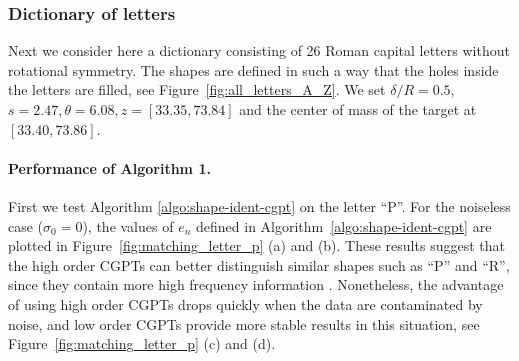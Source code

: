 \subsubsection{Dictionary of letters}
Next we consider here a dictionary consisting of 26 Roman capital
letters without rotational symmetry. The shapes are defined in
such a way that the holes inside the letters are filled, see
Figure~\ref{fig:all_letters_A_Z}. We set $\delta/R=0.5$, $s= 2.47,
\theta = 6.08, z= [33.35, 73.84]$ and the center of mass of the
target at $[33.40, 73.86]$.

\paragraph{Performance of Algorithm 1.}

First we test Algorithm \ref{algo:shape-ident-cgpt} on the letter
``P''. For the noiseless case ($\sigma_0=0$), the values of $e_n$
defined in Algorithm~\ref{algo:shape-ident-cgpt} are plotted in
Figure~\ref{fig:matching_letter_p} (a) and (b). These results
suggest that the high order CGPTs can better distinguish similar
shapes such as ``P'' and ``R'', since they contain more high
frequency information \cite{AGKLY11}. Nonetheless, the advantage
of using high order CGPTs drops quickly when the data are
contaminated by noise, and low order CGPTs provide more stable
results in this situation, see Figure~\ref{fig:matching_letter_p}
(c) and (d).


